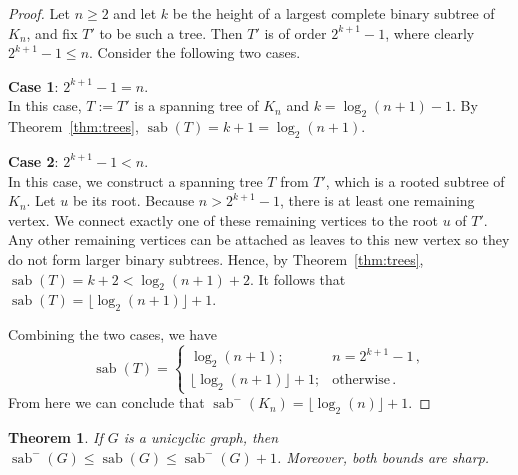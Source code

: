 \documentclass[10pt,a4paper]{amsart}
\newtheorem{theorem}{Theorem}[section]
\DeclareMathOperator{\sab}{\mathrm{sab}}
\begin{document}
\begin{proof}
Let $n\ge 2$ and let $k$ be the height of a largest complete binary subtree of $K_n$, and fix $T'$ to be such a tree. Then $T'$ is of order $2^{k+1} - 1$, where clearly $2^{k+1} - 1 \le n$. Consider the following two cases. 

\medskip\noindent
{\bf Case 1}: $2^{k+1} - 1 = n$.\\
In this case, $T:=T'$ is a spanning tree of $K_n$ and $k = \log_2(n+1) - 1$. By Theorem~\ref{thm:trees}, $\sab(T) = k + 1 = \log_2(n+1)$.    

\medskip\noindent
{\bf Case 2}: $2^{k+1} - 1 < n$.\\
In this case, we construct a spanning tree $T$ from $T'$, which is a rooted subtree of $K_n$. Let $u$ be its root. Because $n > 2^{k+1} - 1$, there is at least one remaining vertex. We connect exactly one of these remaining vertices to the root $u$ of $T'$. Any other remaining vertices can be attached as leaves to this new vertex so they do not form larger binary subtrees. Hence, by Theorem~\ref{thm:trees}, $\sab(T) = k + 2 <  \log_2(n+1) + 2$. It follows that $\sab(T) = \lfloor \log_2(n+1)\rfloor + 1$.

\medskip
Combining the two cases, we have 
$$\sab(T) =  
\begin{cases}
\log_2(n+1); & n = 2^{k+1} - 1\,,\\[5pt]
\lfloor \log_2(n+1)\rfloor + 1; & \text{otherwise}\,.
\end{cases}$$ 
From here we can conclude that $\sab^{-}(K_n) = \lfloor \log_2(n)\rfloor + 1$.
\end{proof}

\begin{theorem}\label{thm:unicyclic}
If $G$ is a unicyclic graph, then 
$\sab^{-}(G) \leq \sab(G) \leq  \sab^{-}(G)+1$. Moreover, both bounds are sharp.
\end{theorem}
\end{document}
